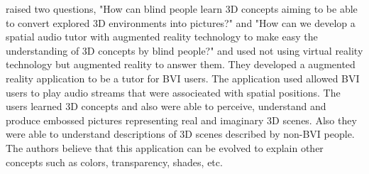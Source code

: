 \cite{kirner2011using} raised two questions, "How can blind people learn 3D concepts aiming to be able to convert explored 3D environments into pictures?" and "How can we develop a spatial audio tutor with augmented reality technology to make easy the understanding of 3D concepts by blind people?" and used not using virtual reality technology but augmented reality to answer them. They developed a augmented reality application to be a tutor for BVI users. The application used allowed BVI users to play audio streams that were associeated with spatial positions. The users learned 3D concepts and also were able to  perceive, understand and produce embossed pictures representing real and imaginary 3D scenes. Also they were able to understand descriptions of 3D scenes described by non-BVI people. The authors believe that this application can be evolved to explain other concepts such as colors, transparency, shades, etc.